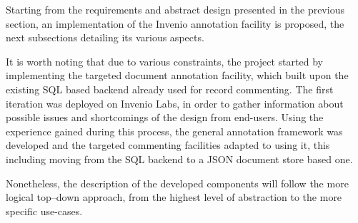 
Starting from the requirements and abstract design presented in the previous
section, an implementation of the Invenio annotation facility is proposed,
the next subsections detailing its various aspects.

It is worth noting that due to various constraints, the project started by
implementing the targeted document annotation facility, which built upon the
existing SQL based backend already used for record commenting. The first
iteration was deployed on Invenio Labs, in order to gather information about
possible issues and shortcomings of the design from end-users. Using the
experience gained during this process, the general annotation framework was
developed and the targeted commenting facilities adapted to using it, this
including moving from the SQL backend to a JSON document store based one.

Nonetheless, the description of the developed components will follow the more
logical top--down approach, from the highest level of abstraction to the more
specific use-cases.
